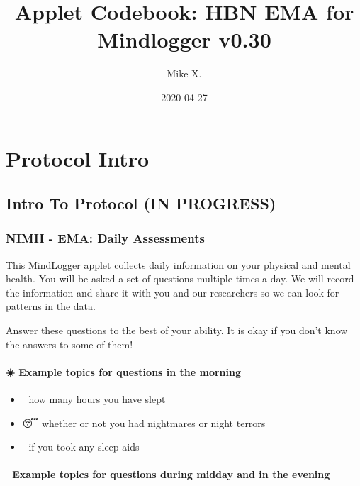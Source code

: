 \documentclass[]{book}
\title{Applet Codebook: HBN EMA for Mindlogger v0.30}
\author{Mike X.}
\date{2020-04-27}
\providecommand{\tightlist}{%
  \setlength{\itemsep}{0pt}\setlength{\parskip}{0pt}}
\begin{document}
\maketitle

{
\setcounter{tocdepth}{1}
\tableofcontents
}
\hypertarget{part-protocol-intro}{%
\part{Protocol Intro}\label{part-protocol-intro}}

\hypertarget{intro}{%
\chapter*{Intro To Protocol (IN PROGRESS)}\label{intro}}

\hypertarget{nimh---ema-daily-assessments}{%
\section{NIMH - EMA: Daily Assessments}\label{nimh---ema-daily-assessments}}

This MindLogger applet collects daily information on your physical and mental health.
You will be asked a set of questions multiple times a day. We will record the information and share it with you and our researchers so we can look for patterns in the data.

Answer these questions to the best of your ability. It is okay if you don't know the answers to some of them!

\hypertarget{example-topics-for-questions-in-the-morning}{%
\subsection{☀️ Example topics for questions in the morning}\label{example-topics-for-questions-in-the-morning}}

\begin{itemize}
\tightlist
\item
  🛌 how many hours you have slept
\item
  😴 whether or not you had nightmares or night terrors
\item
  💊 if you took any sleep aids
\end{itemize}

\hypertarget{example-topics-for-questions-during-midday-and-in-the-evening}{%
\subsection{🌙 Example topics for questions during midday and in the evening}\label{example-topics-for-questions-during-midday-and-in-the-evening}}
\end{document}
